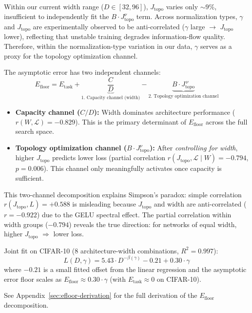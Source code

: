 \documentclass[11pt, a4paper]{article}
\theoremstyle{plain}
\begin{document}
Within our current width range ($D \in [32, 96]$), $J_{\mathrm{topo}}$ varies only $\sim 9\%$, insufficient to independently fit the $B \cdot J_{\mathrm{topo}}^{\nu}$ term. Across normalization types, $\gamma$ and $J_{\mathrm{topo}}$ are experimentally observed to be anti-correlated ($\gamma$ large $\rightarrow$ $J_{\mathrm{topo}}$ lower), reflecting that unstable training degrades information-flow quality. Therefore, within the normalization-type variation in our data, $\gamma$ serves as a proxy for the topology optimization channel.

The asymptotic error has two independent channels:
\begin{equation}
E_{\mathrm{floor}} = E_{\mathrm{task}} + \underbrace{\frac{C}{D}}_{\text{1. Capacity channel (width)}} - \underbrace{B \cdot J_{\mathrm{topo}}^{\,\nu}}_{\text{2. Topology optimization channel}}
\end{equation}
\begin{itemize}
\item \textbf{Capacity channel ($C/D$):} Width dominates architecture performance ($r(W, \mathcal{L}) = -0.829$). This is the primary determinant of $E_{\mathrm{floor}}$ across the full search space.
\item \textbf{Topology optimization channel ($B \cdot J_{\mathrm{topo}}^{\nu}$):} After \emph{controlling for width}, higher $J_{\mathrm{topo}}$ predicts lower loss (partial correlation $r(J_{\mathrm{topo}}, \mathcal{L} \mid W) = -0.794$, $p = 0.006$). This channel only meaningfully activates once capacity is sufficient.
\end{itemize}
This two-channel decomposition explains Simpson's paradox: simple correlation $r(J_{\mathrm{topo}}, L) = +0.588$ is misleading because $J_{\mathrm{topo}}$ and width are anti-correlated ($r = -0.922$) due to the GELU spectral effect. The partial correlation within width groups ($-0.794$) reveals the true direction: for networks of equal width, higher $J_{\mathrm{topo}}$ $\Rightarrow$ lower loss.

Joint fit on CIFAR-10 (8 architecture-width combinations, $R^2 = 0.997$):
\begin{equation}
L(D, \gamma) = 5.43 \cdot D^{-\beta(\gamma)} - 0.21 + 0.30 \cdot \gamma
\end{equation}
where $-0.21$ is a small fitted offset from the linear regression and the asymptotic error floor scales as $E_{\mathrm{floor}} \approx 0.30 \cdot \gamma$ (with $E_{\mathrm{task}} \approx 0$ on CIFAR-10).

See Appendix~\ref{sec:efloor-derivation} for the full derivation of the $E_{\mathrm{floor}}$ decomposition.
\end{document}
